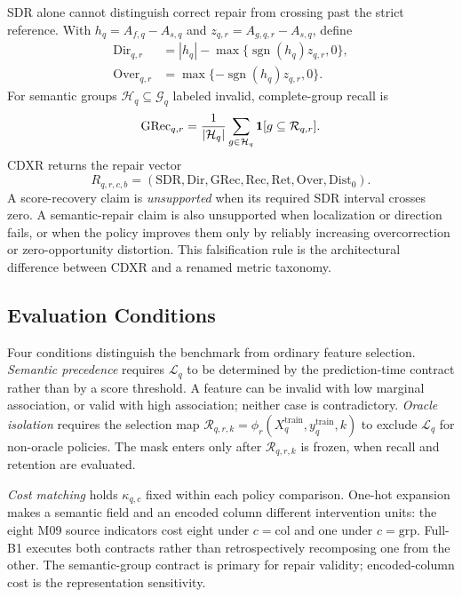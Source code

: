 \documentclass[sigconf,review]{acmart}
\begin{document}
SDR alone cannot distinguish correct repair from crossing past the strict
reference. With $h_q=A_{f,q}-A_{s,q}$ and
$z_{q,r}=A_{g,q,r}-A_{s,q}$, define
\begin{align}
 \mathrm{Dir}_{q,r}&=|h_q|-\max\{\operatorname{sgn}(h_q)z_{q,r},0\},
 \label{eq:directional-repair}\\
 \mathrm{Over}_{q,r}&=\max\{-\operatorname{sgn}(h_q)z_{q,r},0\}.
 \label{eq:overcorrection}
\end{align}
For semantic groups $\mathcal{H}_q\subseteq\mathcal{G}_q$ labeled invalid,
complete-group recall is
\begin{equation}
 \mathrm{GRec}_{q,r}={1\over|\mathcal{H}_q|}
 \sum_{g\in\mathcal{H}_q}\mathbf{1}[g\subseteq\mathcal{R}_{q,r}].
 \label{eq:group-recall}
\end{equation}
CDXR returns the repair vector
\begin{equation}
 R_{q,r,c,b}=(\mathrm{SDR},\mathrm{Dir},\mathrm{GRec},
 \mathrm{Rec},\mathrm{Ret},\mathrm{Over},\mathrm{Dist}_0).
 \label{eq:repair-vector}
\end{equation}
A score-recovery claim is \emph{unsupported} when its required SDR interval
crosses zero. A semantic-repair claim is also unsupported when localization or
direction fails, or when the policy improves them only by reliably increasing
overcorrection or zero-opportunity distortion. This falsification rule is the
architectural difference between CDXR and a renamed metric taxonomy.

\subsection{Evaluation Conditions}

Four conditions distinguish the benchmark from ordinary feature selection.
\textit{Semantic precedence} requires $\mathcal{L}_q$ to be determined by the
prediction-time contract rather than by a score threshold. A feature can be
invalid with low marginal association, or valid with high association; neither
case is contradictory. \textit{Oracle isolation} requires the selection map
$\mathcal{R}_{q,r,k}=\phi_r(X_q^{\mathrm{train}},y_q^{\mathrm{train}},k)$
to exclude $\mathcal{L}_q$ for non-oracle policies. The mask enters only after
$\mathcal{R}_{q,r,k}$ is frozen, when recall and retention are evaluated.

\textit{Cost matching} holds $\kappa_{q,c}$ fixed within each policy
comparison. One-hot expansion makes a semantic field and an encoded column
different intervention units: the eight M09 source indicators cost eight under
$c=\mathrm{col}$ and one under $c=\mathrm{grp}$. Full-B1 executes both
contracts rather than retrospectively recomposing one from the other. The
semantic-group contract is primary for repair validity; encoded-column cost is
the representation sensitivity.
\end{document}
